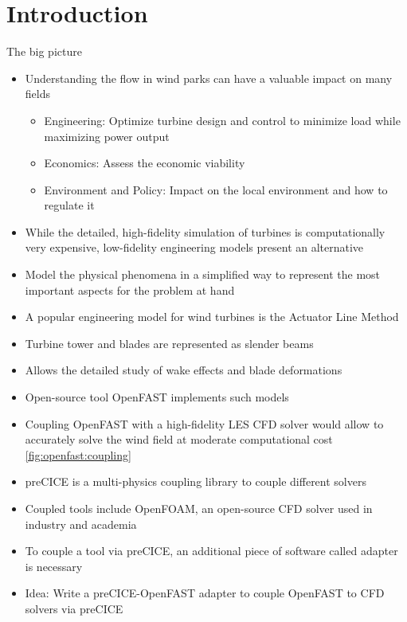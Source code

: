\section{Introduction}

The big picture
\\
 \begin{itemize}
 	\item Understanding the flow in wind parks can have a valuable impact on many fields
 	\begin{itemize}
 		\item Engineering: Optimize turbine design and control to minimize load while maximizing power output
 		\item Economics: Assess the economic viability
 		\item Environment and Policy: Impact on the local environment and how to regulate it
 	\end{itemize}
 	\item While the detailed, high-fidelity simulation of turbines is computationally very expensive, low-fidelity engineering models present an alternative
 	\item Model the physical phenomena in a simplified way to represent the most important aspects for the problem at hand
 	\item A popular engineering model for wind turbines is the Actuator Line Method
 	\item Turbine tower and blades are represented as slender beams
 	\item Allows the detailed study of wake effects and blade deformations
 	\item Open-source tool OpenFAST implements such models
 	\item Coupling OpenFAST with a high-fidelity LES CFD solver would allow to accurately solve the wind field at moderate computational cost \ref{fig:openfast:coupling}
 	\item preCICE is a multi-physics coupling library to couple different solvers
 	\item Coupled tools include OpenFOAM, an open-source CFD solver used in industry and academia
 	\item To couple a tool via preCICE, an additional piece of software called adapter is necessary
 	\item Idea: Write a preCICE-OpenFAST adapter to couple OpenFAST to CFD solvers via preCICE
 	\\
 \end{itemize}

